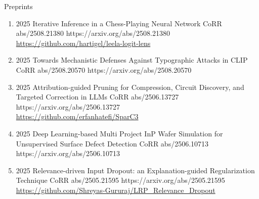 \headedsubsection %
{Preprints}{}
{
    \begin{enumerate}
    
        \item {}
                        {2025}
                        {Iterative Inference in a Chess-Playing Neural Network}
                        {CoRR abs/2508.21380}
                        {https://arxiv.org/abs/2508.21380}
                        {
                            \\
                            \href{https://github.com/hartigel/leela-logit-lens}{https://github.com/hartigel/leela-logit-lens}
                        }

            
        \item {}
                        {2025}
                        {Towards Mechanistic Defenses Against Typographic Attacks in CLIP}
                        {CoRR abs/2508.20570}
                        {https://arxiv.org/abs/2508.20570}   
                        
    
        \item {}
                        {2025}
                        {Attribution-guided Pruning for Compression, Circuit Discovery, and Targeted Correction in LLMs}
                        {CoRR abs/2506.13727}
                        {https://arxiv.org/abs/2506.13727}
                        {
                            \\ \href{https://github.com/erfanhatefi/SparC3}{https://github.com/erfanhatefi/SparC3}
                        }
    
    
        \item {}
                        {2025}
                        {Deep Learning-based Multi Project InP Wafer Simulation for Unsupervised Surface Defect Detection}
                        {CoRR abs/2506.10713}
                        {https://arxiv.org/abs/2506.10713}
    
    
        \item {}
                        {2025}
                        {Relevance-driven Input Dropout: an Explanation-guided Regularization Technique}
                        {CoRR abs/2505.21595}
                        {https://arxiv.org/abs/2505.21595}
                        {
                            \\\href{https://github.com/Shreyas-Gururaj/LRP_Relevance_Dropout}{https://github.com/Shreyas-Gururaj/LRP\_Relevance\_Dropout}
                        }
    

\end{enumerate}}

